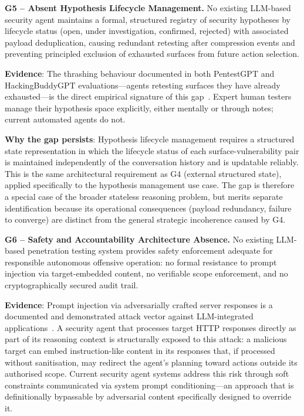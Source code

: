 \documentclass[12pt,a4paper,oneside,openany]{book}
\begin{document}
\vspace{0.4cm}


\noindent\textbf{G5 -- Absent Hypothesis Lifecycle Management.} No existing LLM-based security agent maintains a formal, structured registry of security hypotheses by lifecycle status (open, under investigation, confirmed, rejected) with associated payload deduplication, causing redundant retesting after compression events and preventing principled exclusion of exhausted surfaces from future action selection.


\textbf{Evidence}: The thrashing behaviour documented in both PentestGPT and HackingBuddyGPT evaluations---agents retesting surfaces they have already exhausted---is the direct empirical signature of this gap~\citep{deng2024pentestgpt,happe2023hackerllm}. Expert human testers manage their hypothesis space explicitly, either mentally or through notes; current automated agents do not.

\textbf{Why the gap persists}: Hypothesis lifecycle management requires a structured state representation in which the lifecycle status of each surface-vulnerability pair is maintained independently of the conversation history and is updatable reliably. This is the same architectural requirement as G4 (external structured state), applied specifically to the hypothesis management use case. The gap is therefore a special case of the broader stateless reasoning problem, but merits separate identification because its operational consequences (payload redundancy, failure to converge) are distinct from the general strategic incoherence caused by G4.

\vspace{0.4cm}


\noindent\textbf{G6 -- Safety and Accountability Architecture Absence.} No existing LLM-based penetration testing system provides safety enforcement adequate for responsible autonomous offensive operation: no formal resistance to prompt injection via target-embedded content, no verifiable scope enforcement, and no cryptographically secured audit trail.


\textbf{Evidence}: Prompt injection via adversarially crafted server responses is a documented and demonstrated attack vector against LLM-integrated applications~\citep{greshake2023indirect}. A security agent that processes target HTTP responses directly as part of its reasoning context is structurally exposed to this attack: a malicious target can embed instruction-like content in its responses that, if processed without sanitisation, may redirect the agent's planning toward actions outside its authorised scope. Current security agent systems address this risk through soft constraints communicated via system prompt conditioning---an approach that is definitionally bypassable by adversarial content specifically designed to override it.
\end{document}
